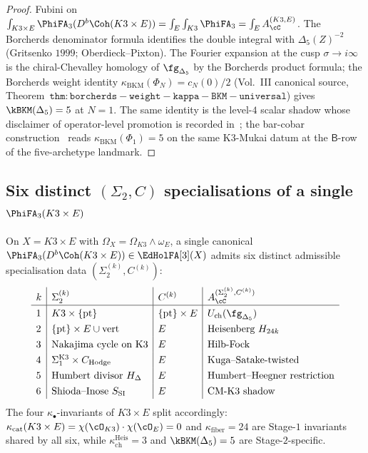 \begin{proof}
Fubini on $\int_{K3\times E}\PhiFA_3(D^b\Coh(K3\times E))=\int_E\int_{K3}\PhiFA_3=\int_E A_\cC^{(K3,E)}$. The Borcherds denominator formula identifies the double integral with $\Delta_5(Z)^{-2}$ (Gritsenko $1999$; Oberdieck--Pixton). The Fourier expansion at the cusp $\sigma\to i\infty$ is the chiral-Chevalley homology of $\fg_{\Delta_5}$ by the Borcherds product formula; the Borcherds weight identity $\kappa_{\mathrm{BKM}}(\Phi_N)=c_N(0)/2$ (Vol.~III canonical source, Theorem~$\mathtt{thm:borcherds-weight-kappa-BKM-universal}$) gives $\kBKM(\Delta_5)=5$ at $N=1$. The same identity is the level-$4$ scalar shadow whose disclaimer of operator-level promotion is recorded in~\cite{LorgatIgusaCuspForm}; the bar-cobar construction~\cite{VolI} reads $\kappa_{\mathrm{BKM}}(\Phi_1) = 5$ on the same K3-Mukai datum at the $\mathsf{B}$-row of the five-archetype landmark.
\end{proof}

\subsection{Six distinct \texorpdfstring{$(\Sigma_2,C)$}{(Sigma-2, C)} specialisations of a single \texorpdfstring{$\PhiFA_3(K3\times E)$}{PhiFA-3(K3 x E)}}
\label{subsec:stage2-six-specialisations}

\begin{proposition}
\label{prop:stage2-six-specialisations}
On $X=K3\times E$ with $\Omega_X=\Omega_{K3}\wedge\omega_E$, a single canonical $\PhiFA_3(D^b\Coh(K3\times E))\in\EdHolFA[3](X)$ admits six distinct admissible specialisation data $(\Sigma_2^{(k)},C^{(k)})$:
\[
\renewcommand{\arraystretch}{1.3}
\begin{array}{l|l|l|l}
 k & \Sigma_2^{(k)} & C^{(k)} & A_\cC^{(\Sigma_2^{(k)},C^{(k)})} \\ \hline
 1 & K3\times\{\mathrm{pt}\} & \{\mathrm{pt}\}\times E & U_{\mathrm{ch}}(\fg_{\Delta_5}) \\
 2 & \{\mathrm{pt}\}\times E\cup\mathrm{vert} & E & \text{Heisenberg }H_{24k} \\
 3 & \text{Nakajima cycle on K3} & E & \text{Hilb-Fock} \\
 4 & \Sigma_1^{\mathrm{K3}}\times C_{\mathrm{Hodge}} & E & \text{Kuga--Satake-twisted} \\
 5 & \text{Humbert divisor }H_\Delta & E & \text{Humbert--Heegner restriction} \\
 6 & \text{Shioda--Inose }S_{\mathrm{SI}} & E & \text{CM-K3 shadow}
\end{array}
\]
The four $\kappa_\bullet$-invariants of $K3\times E$ split accordingly: $\kappa_{\mathrm{cat}}(K3\times E)=\chi(\cO_{K3})\cdot\chi(\cO_E)=0$ and $\kappa_{\mathrm{fiber}}=24$ are Stage-$1$ invariants shared by all six, while $\kappa_{\mathrm{ch}}^{\mathrm{Heis}}=3$ and $\kBKM(\Delta_5)=5$ are Stage-$2$-specific.
\end{proposition}

